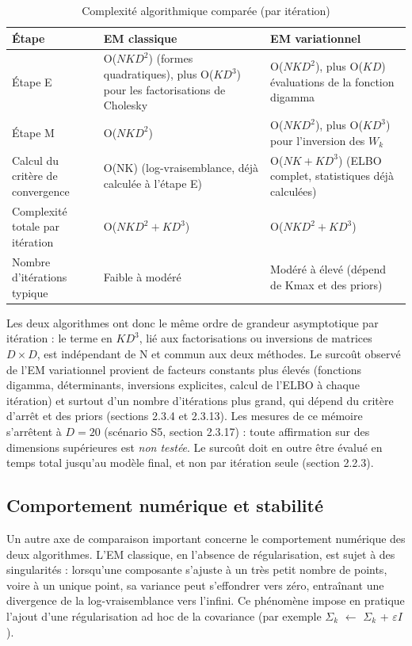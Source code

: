\begin{table}[H]
\centering
\small
\setlength{\tabcolsep}{0.14cm}
\begin{tabular}{|p{4.84cm}|p{4.84cm}|p{4.84cm}|}
\hline
\textbf{Étape} & \textbf{EM classique} & \textbf{EM variationnel} \\
\hline
Étape E & O($NKD^{2}$) (formes quadratiques), plus O($KD^{3}$) pour les factorisations de Cholesky & O($NKD^{2}$), plus O($KD$) évaluations de la fonction digamma \\
\hline
Étape M & O($NKD^{2}$) & O($NKD^{2}$), plus O($KD^{3}$) pour l'inversion des $W_{k}$ \\
\hline
Calcul du critère de convergence & O(NK) (log-vraisemblance, déjà calculée à l'étape E) & O($NK + KD^{3}$) (ELBO complet, statistiques déjà calculées) \\
\hline
Complexité totale par itération & O($NKD^{2} + KD^{3}$) & O($NKD^{2} + KD^{3}$) \\
\hline
Nombre d'itérations typique & Faible à modéré & Modéré à élevé (dépend de Kmax et des priors) \\
\hline
\end{tabular}
\caption{Complexité algorithmique comparée (par itération)}
\label{tab:2_3}
\end{table}
Les deux algorithmes ont donc le même ordre de grandeur asymptotique par itération : le terme en $KD^{3}$, lié aux factorisations ou inversions de matrices $D \times D$, est indépendant de N et commun aux deux méthodes. Le surcoût observé de l'EM variationnel provient de facteurs constants plus élevés (fonctions digamma, déterminants, inversions explicites, calcul de l'ELBO à chaque itération) et surtout d'un nombre d'itérations plus grand, qui dépend du critère d'arrêt et des priors (sections 2.3.4 et 2.3.13). Les mesures de ce mémoire s'arrêtent à $D = 20$ (scénario S5, section 2.3.17) : toute affirmation sur des dimensions supérieures est \emph{non testée}. Le surcoût doit en outre être évalué en temps total jusqu'au modèle final, et non par itération seule (section 2.2.3).

\subsection{Comportement numérique et stabilité}
Un autre axe de comparaison important concerne le comportement numérique des deux algorithmes. L'EM classique, en l'absence de régularisation, est sujet à des singularités : lorsqu'une composante s'ajuste à un très petit nombre de points, voire à un unique point, sa variance peut s'effondrer vers zéro, entraînant une divergence de la log-vraisemblance vers l'infini. Ce phénomène impose en pratique l'ajout d'une régularisation ad hoc de la covariance (par exemple $\Sigma _{k}$ $\leftarrow $ $\Sigma _{k}$ + $\varepsilon I$).

